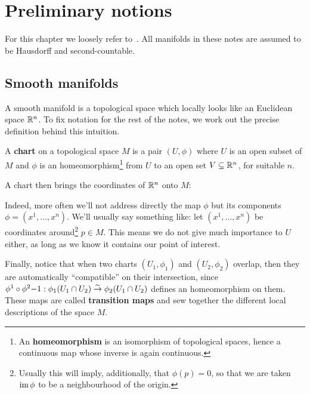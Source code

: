 \documentclass[main.tex]{subfiles}
\begin{document}
\chapter{Preliminary notions}
For this chapter we loosely refer to~\cite{abate2011geometria}. All manifolds in these notes are assumed to be Hausdorff and second-countable.

\section{Smooth manifolds}
A smooth manifold is a topological space which locally looks like an Euclidean space $\mathbb{R}^n$. To fix notation for the rest of the notes, we work out the precise definition behind this intuition.

\begin{definition}
	A \textbf{chart} on a topological space $M$ is a pair $(U, \phi)$ where $U$ is an open subset of $M$ and $\phi$ is an homeomorphism\footnote{An \textbf{homeomorphism} is an isomorphism of topological spaces, hence a continuous map whose inverse is again continuous.} from $U$ to an open set $V \subseteq \mathbb{R}^n$, for suitable $n$.
\end{definition}

A chart then brings the coordinates of $\mathbb{R}^n$ onto $M$:

\begin{figure}[H]
	\centering
\end{figure}

Indeed, more often we'll not address directly the map $\phi$ but its components $\phi = (x^1, \ldots, x^n)$. We'll usually say something like: let $(x^1, \ldots, x^n)$ be coordinates around\footnote{Usually this will imply, additionally, that $\phi(p) = 0$, so that we are taken $\operatorname{im} \phi$ to be a neighbourhood of the origin.} $p \in M$. This means we do not give much importance to $U$ either, as long as we know it contains our point of interest.

Finally, notice that when two charts $(U_1, \phi_1)$ and $(U_2, \phi_2)$ overlap, then they are automatically ``compatible'' on their intersection, since $\phi^1 \circ \phi^2{-1} : \phi_1(U_1 \cap U_2) \overset{\sim}\to \phi_2(U_1 \cap U_2)$ defines an homeomorphism on them. These maps are called \textbf{transition maps} and sew together the different local descriptions of the space $M$.
\end{document}
